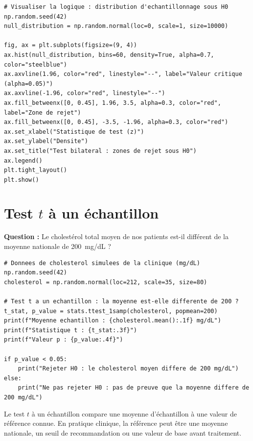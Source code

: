 \begin{verbatim}
# Visualiser la logique : distribution d'echantillonnage sous H0
np.random.seed(42)
null_distribution = np.random.normal(loc=0, scale=1, size=10000)

fig, ax = plt.subplots(figsize=(9, 4))
ax.hist(null_distribution, bins=60, density=True, alpha=0.7, color="steelblue")
ax.axvline(1.96, color="red", linestyle="--", label="Valeur critique (alpha=0.05)")
ax.axvline(-1.96, color="red", linestyle="--")
ax.fill_betweenx([0, 0.45], 1.96, 3.5, alpha=0.3, color="red", label="Zone de rejet")
ax.fill_betweenx([0, 0.45], -3.5, -1.96, alpha=0.3, color="red")
ax.set_xlabel("Statistique de test (z)")
ax.set_ylabel("Densite")
ax.set_title("Test bilateral : zones de rejet sous H0")
ax.legend()
plt.tight_layout()
plt.show()
\end{verbatim}

\section{Test $t$ \`a un \'echantillon}

\textbf{Question :} Le cholest\'erol total moyen de nos patients est-il diff\'erent de la moyenne nationale de 200~mg/dL ?

\begin{verbatim}
# Donnees de cholesterol simulees de la clinique (mg/dL)
np.random.seed(42)
cholesterol = np.random.normal(loc=212, scale=35, size=80)

# Test t a un echantillon : la moyenne est-elle differente de 200 ?
t_stat, p_value = stats.ttest_1samp(cholesterol, popmean=200)
print(f"Moyenne echantillon : {cholesterol.mean():.1f} mg/dL")
print(f"Statistique t : {t_stat:.3f}")
print(f"Valeur p : {p_value:.4f}")

if p_value < 0.05:
    print("Rejeter H0 : le cholesterol moyen differe de 200 mg/dL")
else:
    print("Ne pas rejeter H0 : pas de preuve que la moyenne differe de 200 mg/dL")
\end{verbatim}

\begin{clinicalnote}
Le test $t$ \`a un \'echantillon compare une moyenne d'\'echantillon \`a une valeur de r\'ef\'erence connue. En pratique clinique, la r\'ef\'erence peut \^etre une moyenne nationale, un seuil de recommandation ou une valeur de base avant traitement.
\end{clinicalnote}

